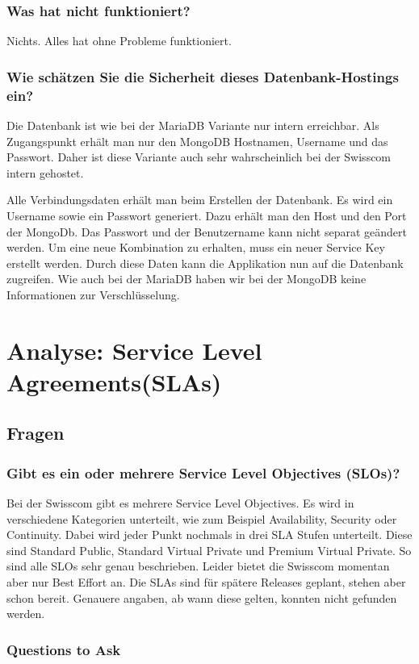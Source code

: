 \subsection{Was hat nicht funktioniert?}
Nichts. Alles hat ohne Probleme funktioniert. 
\subsection{Wie schätzen Sie die Sicherheit dieses Datenbank-Hostings ein?}
Die Datenbank ist wie bei der MariaDB Variante nur intern erreichbar. Als Zugangspunkt erhält man nur den MongoDB Hostnamen, Username und das Passwort. Daher ist diese Variante auch sehr wahrscheinlich bei der Swisscom intern gehostet.

Alle Verbindungsdaten erhält man beim Erstellen der Datenbank. Es wird ein Username sowie ein Passwort generiert. Dazu erhält man den Host und den Port der MongoDb. Das Passwort und der Benutzername kann nicht separat geändert werden. Um eine neue Kombination zu erhalten, muss ein neuer Service Key erstellt werden. Durch diese Daten kann die Applikation nun auf die Datenbank zugreifen.  Wie auch bei der MariaDB haben wir bei der MongoDB keine Informationen zur Verschlüsselung.

\chapter{Analyse: Service Level Agreements(SLAs)} %
\section{Fragen}
\subsection{Gibt es ein oder mehrere Service Level Objectives (SLOs)?}
Bei der Swisscom gibt es mehrere Service Level Objectives. Es wird in verschiedene Kategorien unterteilt, wie zum Beispiel Availability, Security oder Continuity. Dabei wird jeder Punkt nochmals in drei SLA Stufen unterteilt. Diese sind Standard Public, Standard Virtual Private und Premium Virtual Private. So sind alle SLOs sehr genau beschrieben. Leider bietet die Swisscom momentan aber nur Best Effort an. Die SLAs sind für spätere Releases geplant, stehen aber schon bereit. Genauere angaben, ab wann diese gelten, konnten nicht gefunden werden. 
\subsection{Questions to Ask}

